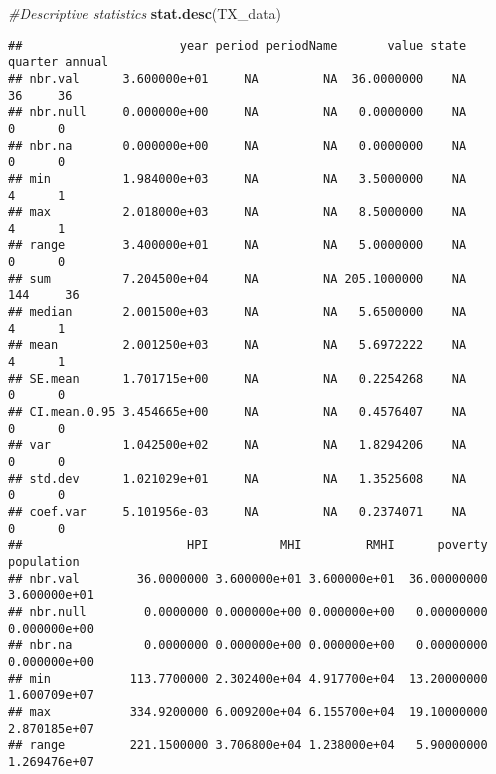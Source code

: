 \documentclass[
]{article}
\newenvironment{Shaded}{\begin{snugshade}}{\end{snugshade}}
\newcommand{\CommentTok}[1]{\textcolor[rgb]{0.56,0.35,0.01}{\textit{#1}}}
\newcommand{\KeywordTok}[1]{\textcolor[rgb]{0.13,0.29,0.53}{\textbf{#1}}}
\newcommand{\NormalTok}[1]{#1}
\newcommand{\OperatorTok}[1]{\textcolor[rgb]{0.81,0.36,0.00}{\textbf{#1}}}
\newcommand{\StringTok}[1]{\textcolor[rgb]{0.31,0.60,0.02}{#1}}
\begin{document}
\begin{Shaded}
\end{Shaded}

\begin{Shaded}
\begin{Highlighting}[]
\CommentTok{#Descriptive statistics}
\KeywordTok{stat.desc}\NormalTok{(TX_data)}
\end{Highlighting}
\end{Shaded}

\begin{verbatim}
##                      year period periodName       value state quarter annual
## nbr.val      3.600000e+01     NA         NA  36.0000000    NA      36     36
## nbr.null     0.000000e+00     NA         NA   0.0000000    NA       0      0
## nbr.na       0.000000e+00     NA         NA   0.0000000    NA       0      0
## min          1.984000e+03     NA         NA   3.5000000    NA       4      1
## max          2.018000e+03     NA         NA   8.5000000    NA       4      1
## range        3.400000e+01     NA         NA   5.0000000    NA       0      0
## sum          7.204500e+04     NA         NA 205.1000000    NA     144     36
## median       2.001500e+03     NA         NA   5.6500000    NA       4      1
## mean         2.001250e+03     NA         NA   5.6972222    NA       4      1
## SE.mean      1.701715e+00     NA         NA   0.2254268    NA       0      0
## CI.mean.0.95 3.454665e+00     NA         NA   0.4576407    NA       0      0
## var          1.042500e+02     NA         NA   1.8294206    NA       0      0
## std.dev      1.021029e+01     NA         NA   1.3525608    NA       0      0
## coef.var     5.101956e-03     NA         NA   0.2374071    NA       0      0
##                       HPI          MHI         RMHI      poverty   population
## nbr.val        36.0000000 3.600000e+01 3.600000e+01  36.00000000 3.600000e+01
## nbr.null        0.0000000 0.000000e+00 0.000000e+00   0.00000000 0.000000e+00
## nbr.na          0.0000000 0.000000e+00 0.000000e+00   0.00000000 0.000000e+00
## min           113.7700000 2.302400e+04 4.917700e+04  13.20000000 1.600709e+07
## max           334.9200000 6.009200e+04 6.155700e+04  19.10000000 2.870185e+07
## range         221.1500000 3.706800e+04 1.238000e+04   5.90000000 1.269476e+07

\end{verbatim}
\end{document}
